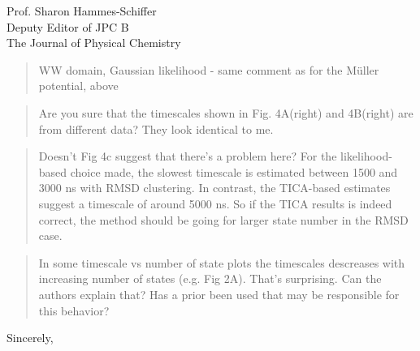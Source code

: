 \documentclass{letter}
\begin{document}
\begin{letter}{Prof. Sharon Hammes-Schiffer \\ Deputy Editor of JPC B \\ The Journal of Physical Chemistry}
\begin{quote}
WW domain, Gaussian likelihood - same comment as for the Müller potential, above
\end{quote}

\begin{quote}
Are you sure that the timescales shown in Fig. 4A(right) and 4B(right) are from different data? They look identical to me.
\end{quote}

\begin{quote}
 Doesn’t Fig 4c suggest that there’s a problem here? For the likelihood-based choice made, the slowest timescale is estimated between 1500 and 3000 ns with RMSD clustering. In contrast, the TICA-based estimates suggest a timescale of around 5000 ns. So if the TICA results is indeed correct, the method should be going for larger state number in the RMSD case.
\end{quote}

\begin{quote}
In some timescale vs number of state plots the timescales descreases with increasing number of states (e.g. Fig 2A). That’s surprising. Can the authors explain that? Has a prior been used that may be responsible for this behavior?
\end{quote}


\closing{Sincerely,}


\end{letter}
\end{document}
